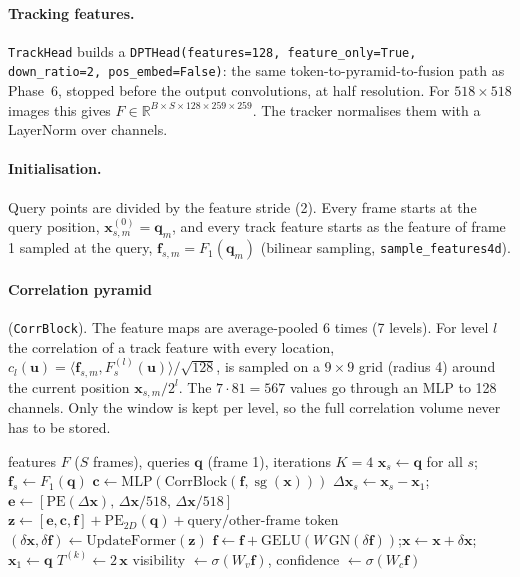 \documentclass[11pt,a4paper]{article}
\newcommand{\src}[1]{\texttt{\small #1}}
\begin{document}
\paragraph{Tracking features.} \texttt{TrackHead} builds a \texttt{DPTHead(features=128, feature\_only=True, down\_ratio=2,
pos\_embed=False)}: the same token-to-pyramid-to-fusion path as Phase~6, stopped before the output convolutions, at half
resolution. For $518\times518$ images this gives $F\in\mathbb{R}^{B\times S\times 128\times 259\times 259}$. The tracker
normalises them with a LayerNorm over channels.

\paragraph{Initialisation.} Query points are divided by the feature stride (2). Every frame starts at the query position,
$\mathbf{x}_{s,m}^{(0)} = \mathbf{q}_m$, and every track feature starts as the feature of frame 1 sampled at the query,
$\mathbf{f}_{s,m} = F_1(\mathbf{q}_m)$ (bilinear sampling, \texttt{sample\_features4d}).

\paragraph{Correlation pyramid} (\texttt{CorrBlock}). The feature maps are average-pooled 6 times (7 levels). For level $l$ the
correlation of a track feature with every location, $c_l(\mathbf{u}) = \langle\mathbf{f}_{s,m}, F_s^{(l)}(\mathbf{u})\rangle/\sqrt{128}$,
is sampled on a $9\times9$ grid (radius 4) around the current position $\mathbf{x}_{s,m}/2^l$. The $7\cdot81 = 567$ values
go through an MLP to 128 channels. Only the window is kept per level, so the full correlation volume never has to be stored.

\begin{algorithm}[htbp]
\caption{Iterative tracker (\texttt{BaseTrackerPredictor.forward}, \src{base\_track\_predictor.py:47--120})}
\begin{algorithmic}[1]
\Require features $F$ ($S$ frames), queries $\mathbf{q}$ (frame 1), iterations $K=4$
\State $\mathbf{x}_s \gets \mathbf{q}$ for all $s$;\quad $\mathbf{f}_s \gets F_1(\mathbf{q})$
  \State $\mathbf{c} \gets \mathrm{MLP}(\mathrm{CorrBlock}(\mathbf{f}, \operatorname{sg}(\mathbf{x})))$ 
  \State $\Delta\mathbf{x}_s \gets \mathbf{x}_s - \mathbf{x}_1$;\quad $\mathbf{e} \gets [\mathrm{PE}(\Delta\mathbf{x}),\, \Delta\mathbf{x}/518,\, \Delta\mathbf{x}/518]$
  \State $\mathbf{z} \gets [\mathbf{e}, \mathbf{c}, \mathbf{f}] + \mathrm{PE}_{2D}(\mathbf{q}) + \text{query/other-frame token}$ 
  \State $(\delta\mathbf{x}, \delta\mathbf{f}) \gets \mathrm{UpdateFormer}(\mathbf{z})$
  \State $\mathbf{f} \gets \mathbf{f} + \mathrm{GELU}(W\,\mathrm{GN}(\delta\mathbf{f}))$;\quad $\mathbf{x} \gets \mathbf{x} + \delta\mathbf{x}$;\quad $\mathbf{x}_1 \gets \mathbf{q}$
  \State $T^{(k)} \gets 2\,\mathbf{x}$ 
\EndFor
\State visibility $\gets \sigma(W_v\mathbf{f})$, confidence $\gets \sigma(W_c\mathbf{f})$
\end{algorithmic}
\end{algorithm}
\end{document}
